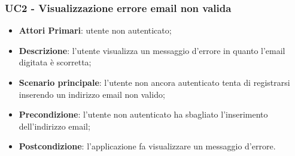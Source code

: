 
\subsubsection{UC2 - Visualizzazione errore email non valida}
\begin{itemize}
	\item \textbf{Attori Primari}: utente non autenticato;
	\item \textbf{Descrizione}: l'utente visualizza un messaggio d'errore in quanto l'email digitata è scorretta;
	\item \textbf{Scenario principale}: l'utente non ancora autenticato tenta di registrarsi inserendo un indirizzo email non valido;
	\item \textbf{Precondizione}: l'utente non autenticato ha sbagliato l'inserimento dell'indirizzo email; 
	\item \textbf{Postcondizione}: l'applicazione fa visualizzare un messaggio d'errore.
\end{itemize}


